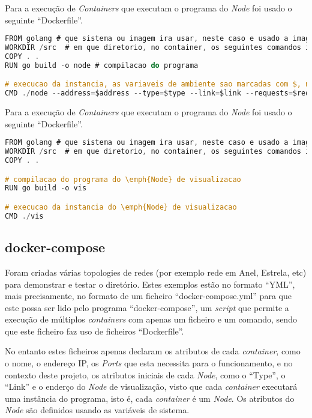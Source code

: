 Para a execução de \emph{Containers} que executam o programa do \emph{Node} foi usado o seguinte ``Dockerfile''.
\begin{lstlisting}[caption={``Dockerfile'' do \emph{Node}},language=C]
FROM golang # que sistema ou imagem ira usar, neste caso e usado a imagem ``golang''
WORKDIR /src  # em que diretorio, no container, os seguintes comandos irao ser executados
COPY . .
RUN go build -o node # compilacao do programa

# execucao da instancia, as variaveis de ambiente sao marcadas com $, no entanto serao descritas a sua origem de seguida
CMD ./node --address=$address --type=$type --link=$link --requests=$requests --visualization=$VIS_ADDRESS
\end{lstlisting}
 
Para a execução de \emph{Containers} que executam o programa do \emph{Node} foi usado o seguinte ``Dockerfile''.
\begin{lstlisting}[caption={``Dockerfile'' do \emph{Node}},language=C]
FROM golang # que sistema ou imagem ira usar, neste caso e usado a imagem ``golang''
WORKDIR /src  # em que diretorio, no container, os seguintes comandos irao ser executados
COPY . .

# compilacao do programa do \emph{Node} de visualizacao
RUN go build -o vis

# execucao da instancia do \emph{Node} de visualizacao
CMD ./vis

\end{lstlisting}

\subsection*{docker-compose}

Foram criadas várias topologies de redes (por exemplo rede em Anel, Estrela, etc) para demonstrar e testar o diretório.
Estes exemplos estão no formato ``YML'', mais precisamente, no formato de um ficheiro ``docker-compose.yml'' para que este possa ser lido pelo programa ``docker-compose'', um \emph{script} que permite a execução de múltiplos \emph{containers} com apenas um ficheiro e um comando, sendo que este ficheiro faz uso de ficheiros ``Dockerfile''.

No entanto estes ficheiros apenas declaram os atributos de cada \emph{container}, como o nome, o endereço \acs{IP}, os \emph{Ports} que esta necessita para o funcionamento, e no contexto deste projeto, os atributos iniciais de cada \emph{Node}, como o ``Type'', o 
``Link'' e o enderço do \emph{Node} de visualização, visto que cada \emph{container} executará uma instância do programa, isto é, cada \emph{container} é um \emph{Node}. Os atributos do \emph{Node} são definidos usando as variáveis de sistema.


